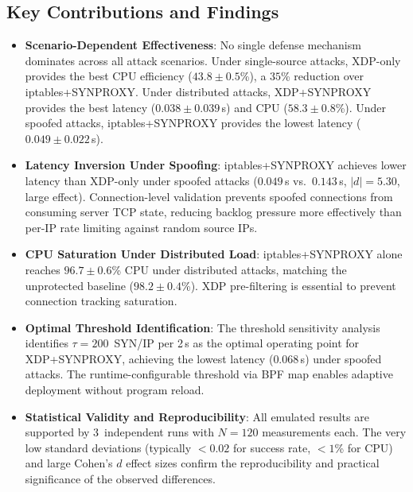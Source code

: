 \documentclass[conference]{IEEEtran}
\begin{document}
\subsection{Key Contributions and Findings}

\begin{itemize}

  \item \textbf{Scenario-Dependent Effectiveness}:
  No single defense mechanism dominates across all attack scenarios.
  Under single-source attacks, XDP-only provides the best CPU efficiency
  ($43.8 \pm 0.5$\%), a $35$\% reduction over iptables+SYNPROXY.
  Under distributed attacks, XDP+SYNPROXY provides the best latency
  ($0.038 \pm 0.039$\,s) and CPU ($58.3 \pm 0.8$\%).
  Under spoofed attacks, iptables+SYNPROXY provides the lowest latency
  ($0.049 \pm 0.022$\,s).

  \item \textbf{Latency Inversion Under Spoofing}:
  iptables+SYNPROXY achieves lower latency than XDP-only under spoofed
  attacks ($0.049$\,s vs.\ $0.143$\,s, $|d|=5.30$, large effect).
  Connection-level validation prevents spoofed connections from consuming
  server TCP state, reducing backlog pressure more effectively than per-IP
  rate limiting against random source IPs.

  \item \textbf{CPU Saturation Under Distributed Load}:
  iptables+SYNPROXY alone reaches $96.7 \pm 0.6$\% CPU under distributed
  attacks, matching the unprotected baseline ($98.2 \pm 0.4$\%).
  XDP pre-filtering is essential to prevent connection tracking saturation.

  \item \textbf{Optimal Threshold Identification}:
  The threshold sensitivity analysis identifies $\tau=200$~SYN/IP per 2\,s
  as the optimal operating point for XDP+SYNPROXY, achieving the lowest
  latency ($0.068$\,s) under spoofed attacks.
  The runtime-configurable threshold via BPF map enables adaptive
  deployment without program reload.

  \item \textbf{Statistical Validity and Reproducibility}:
  All emulated results are supported by 3~independent runs with $N=120$
  measurements each.
  The very low standard deviations (typically ${<}0.02$ for success rate,
  ${<}1$\% for CPU) and large Cohen's $d$ effect sizes confirm the
  reproducibility and practical significance of the observed differences.

\end{itemize}
\end{document}
